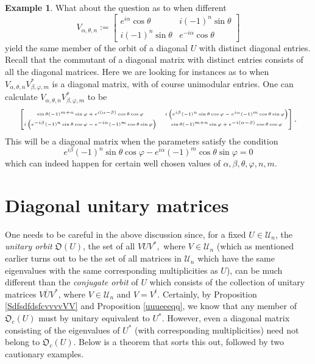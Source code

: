 \documentclass{dis}
\theoremstyle{plain}
\theoremstyle{definition}
\newtheorem{Example}[equation]{Example}
\renewcommand{\phi}{\varphi}
\newcommand{\0}{{\color{lightgray}0}}
\begin{document}
\begin{Example}
 What about the question as to when different
 $$V_{\alpha, \theta, n} := \begin{bmatrix} e^{i \alpha} \cos \theta & i (-1)^n \sin \theta\\
i (-1)^n \sin \theta & e^{-i \alpha} \cos \theta\end{bmatrix}$$
 yield the same member of the orbit of a diagonal $U$ with distinct diagonal entries. Recall that the commutant of a diagonal matrix with distinct entries consists of all the diagonal matrices. Here we are looking for  instances as to when
 $V_{\alpha, \theta, n} V_{\beta, \phi, m}^{*}$ is a diagonal matrix, with of course unimodular entries.  One can calculate
 $V_{\alpha, \theta, n} V_{\beta, \phi, m}^{*}$ to be
 $$
{\tiny  \begin{bmatrix}
 \sin \theta (-1)^{m+n} \sin \phi +e^{i (\alpha -\beta )} \cos \theta  \cos \phi  & i
   \left(e^{i \beta } (-1)^n \sin \theta  \cos \phi -e^{i \alpha } (-1)^m \cos \theta  \sin \phi
   \right) \\
 i \left(e^{-i \beta } (-1)^n \sin \theta  \cos \phi -e^{-i \alpha } (-1)^m \cos \theta  \sin
   \phi \right) & \sin \theta  (-1)^{m+n} \sin \phi +e^{-i (\alpha -\beta )} \cos \theta  \cos
   \phi
   \end{bmatrix}.}$$
   This will be a diagonal matrix when the parameters satisfy the condition 
   $$ e^{i \beta } (-1)^n \sin \theta  \cos \phi -e^{i \alpha } (-1)^m \cos \theta  \sin \phi = 0$$
which can indeed  happen for certain well chosen values of $\alpha, \beta, \theta, \phi, n, m$. 
\end{Example}

\section{Diagonal unitary matrices}

One needs to be careful in the above discussion since, for a fixed $U \in \mathscr{U}_n$,  the  {\em unitary orbit} $\mathfrak{O}(U)$, the set of all 
$V U V^{*},$ where $V \in \mathscr{U}_n$ (which as mentioned earlier turns out to be the set of all matrices in $\mathscr{U}_n$ which have the same eigenvalues with the same corresponding multiplicities as $U$), can be much different than the {\em conjugate orbit} of $U$ which consists of the collection of unitary matrices $V \overline{U} V^{*}$, where $V \in \mathscr{U}_n$ and $V = V^{t}$. Certainly, by Proposition \ref{SdfsdfdsfcvvvvVV} and Proposition \ref{uuueeeqq}, we know that any member of $\mathfrak{O}_c(U)$ must by unitary equivalent to $U^{*}$. However, even a diagonal matrix consisting of the eigenvalues of  $U^{*}$ (with corresponding multiplicities) need not belong to $\mathfrak{O}_c(U)$. Below is a theorem that sorts this out, followed by two cautionary examples. 
\end{document}
